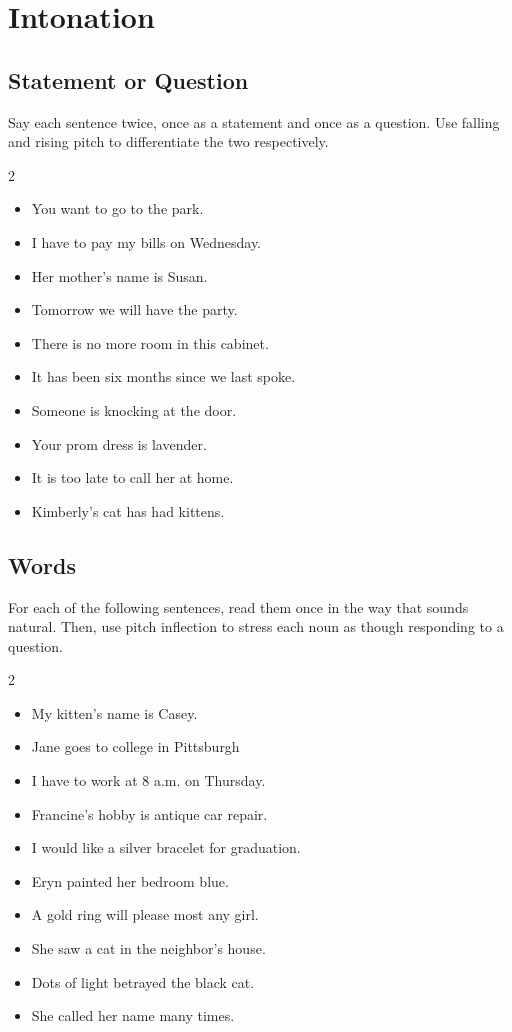 \documentclass{article}
\begin{document}
\pagebreak
\section*{Intonation}
\subsection*{Statement or Question}
Say each sentence twice, once as a statement and once as a question.
Use falling and rising pitch to differentiate the two respectively.
\begin{multicols}{2}
    \begin{itemize}
        \item You want to go to the park.
        \item I have to pay my bills on Wednesday.
        \item Her mother's name is Susan.
        \item Tomorrow we will have the party.
        \item There is no more room in this cabinet.
        \item It has been six months since we last spoke.
        \item Someone is knocking at the door.
        \item Your prom dress is lavender.
        \item It is too late to call her at home.
        \item Kimberly's cat has had kittens.
    \end{itemize}
\end{multicols}

\subsection*{Words}
For each of the following sentences, read them once in the way that sounds natural.
Then, use pitch inflection to stress each noun as though responding to a question.
\begin{multicols}{2}
    \begin{itemize}
        \item My kitten's name is Casey.
        \item Jane goes to college in Pittsburgh
        \item I have to work at 8 a.m. on Thursday.
        \item Francine's hobby is antique car repair.
        \item I would like a silver bracelet for graduation.
        \item Eryn painted her bedroom blue.
        \item A gold ring will please most any girl.
        \item She saw a cat in the neighbor's house.
        \item Dots of light betrayed the black cat.
        \item She called her name many times.
    \end{itemize}
\end{multicols}
\end{document}
